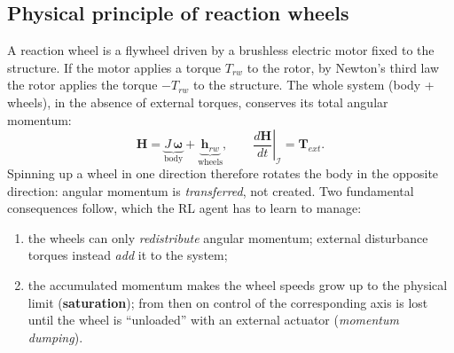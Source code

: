 \documentclass[11pt,a4paper]{article}
\newcommand{\vect}[1]{\bm{#1}}
\newcommand{\w}{\vect{\omega}}
\newcommand{\h}{\vect{h}_{rw}}
\newcommand{\T}{\vect{T}}
\begin{document}
\subsection{Physical principle of reaction wheels}
A reaction wheel is a flywheel driven by a brushless electric motor fixed to
the structure. If the motor applies a torque $T_{rw}$ to the rotor, by Newton's
third law the rotor applies the torque $-T_{rw}$ to the structure. The whole
system (body + wheels), in the absence of external torques, conserves its total
angular momentum:
\begin{equation}
  \vect{H} = \underbrace{J\,\w}_{\text{body}} + \underbrace{\h}_{\text{wheels}},
  \qquad
  \left.\frac{d\vect{H}}{dt}\right|_{\mathcal{I}} = \T_{ext}.
  \label{eq:Htot}
\end{equation}
Spinning up a wheel in one direction therefore rotates the body in the opposite
direction: angular momentum is \emph{transferred}, not created. Two fundamental
consequences follow, which the RL agent has to learn to manage:
\begin{enumerate}[nosep]
  \item the wheels can only \emph{redistribute} angular momentum; external
        disturbance torques instead \emph{add} it to the system;
  \item the accumulated momentum makes the wheel speeds grow up to the
        physical limit (\textbf{saturation}); from then on control of the
        corresponding axis is lost until the wheel is ``unloaded'' with an
        external actuator (\emph{momentum dumping}).
\end{enumerate}
\end{document}
